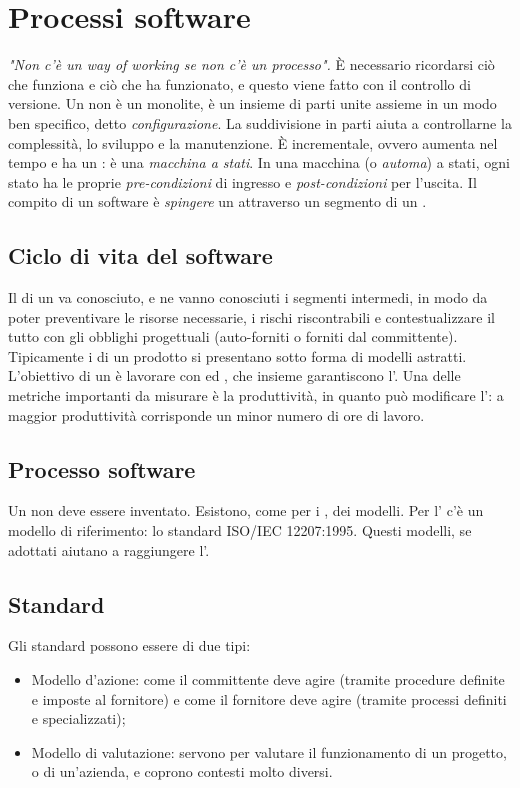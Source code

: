 \documentclass[../main]{subfiles}
\begin{document}
\section{Processi software}
\textit{"Non c'è un way of working se non c'è un processo".}\newline
È necessario ricordarsi ciò che funziona e ciò che ha funzionato, e questo viene fatto con il controllo di versione.\newline
Un  non è un monolite, è un insieme di parti unite assieme in un modo ben specifico, detto \textit{configurazione}. La suddivisione in parti aiuta a controllarne la complessità, lo sviluppo e la manutenzione. È incrementale, ovvero aumenta nel tempo e ha un : è una \textit{macchina a stati}. In una macchina (o \textit{automa}) a stati, ogni stato ha le proprie \textit{pre-condizioni} di ingresso e \textit{post-condizioni} per l'uscita.\newline
Il compito di un  software è \textit{spingere} un  attraverso un segmento di un .
\subsection{Ciclo di vita del software}
Il  di un  va conosciuto, e ne vanno conosciuti i segmenti intermedi, in modo da poter preventivare le risorse necessarie, i rischi riscontrabili e contestualizzare il tutto con gli obblighi progettuali (auto-forniti o forniti dal committente).\newline
Tipicamente i  di un prodotto si presentano sotto forma di modelli astratti.
L'obiettivo di un  è lavorare con  ed , che insieme garantiscono l'. Una delle metriche importanti da misurare è la produttività, in quanto può modificare l': a maggior produttività corrisponde un minor numero di ore di lavoro.
\subsection{Processo software}
Un  non deve essere inventato. Esistono, come per i , dei modelli. Per l' c'è un modello di riferimento: lo standard ISO/IEC 12207:1995. Questi modelli, se adottati aiutano a raggiungere l'.
\subsection{Standard}
Gli standard possono essere di due tipi:
\begin{itemize}
    \item Modello d'azione: come il committente deve agire (tramite procedure definite e imposte al fornitore) e come il fornitore deve agire (tramite processi definiti e specializzati);
    \item Modello di valutazione: servono per valutare il funzionamento di un progetto, o di un'azienda, e coprono contesti molto diversi.
\end{itemize}
\end{document}
